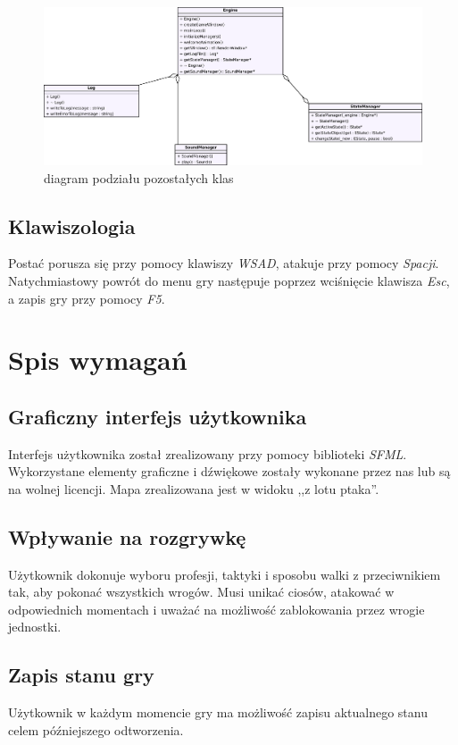 \documentclass[10pt,a4paper]{article}
\begin{document}
\begin{figure}
    \centering
    \includegraphics[width=\textwidth]{uml/class3.pdf}
    \caption{diagram podziału pozostałych klas}
    \label{uml-game3}
\end{figure}

\subsection{Klawiszologia}
Postać porusza się przy pomocy klawiszy \textit{WSAD}, atakuje przy pomocy \textit{Spacji}. Natychmiastowy powrót do menu gry następuje poprzez wciśnięcie klawisza \textit{Esc}, a zapis gry przy pomocy \textit{F5}.

\section{Spis wymagań}
\subsection{Graficzny interfejs użytkownika}
Interfejs użytkownika został zrealizowany przy pomocy biblioteki \textit{SFML}. Wykorzystane elementy graficzne i dźwiękowe zostały wykonane przez nas lub są na wolnej licencji. Mapa zrealizowana jest w widoku ,,z lotu ptaka''.

\subsection{Wpływanie na rozgrywkę}
Użytkownik dokonuje wyboru profesji, taktyki i sposobu walki z przeciwnikiem tak, aby pokonać wszystkich wrogów. Musi unikać ciosów, atakować w odpowiednich momentach i uważać na możliwość zablokowania przez wrogie jednostki.

\subsection{Zapis stanu gry}
Użytkownik w każdym momencie gry ma możliwość zapisu aktualnego stanu celem późniejszego odtworzenia.
\end{document}
